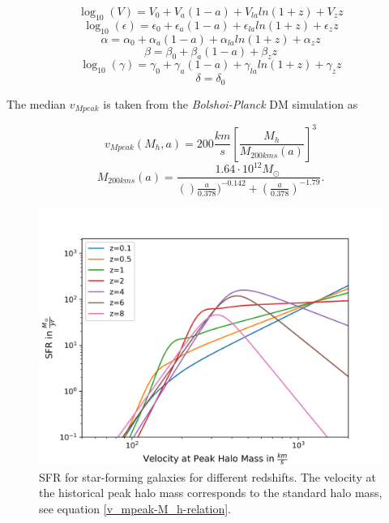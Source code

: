 \begin{equation}
    \log_{10}(V) = V_0 + V_a(1-a)+V_{la}ln(1+z)+V_z z
\end{equation}
\begin{equation}
    \log_{10}(\epsilon) = \epsilon_0 + \epsilon_a(1-a)+\epsilon_{la}ln(1+z)+\epsilon_z z
\end{equation}
\begin{equation}
    \alpha = \alpha_0 + \alpha_a(1-a)+\alpha_{la}ln(1+z)+\alpha_z z
\end{equation}
\begin{equation}
    \beta = \beta_0 + \beta_a(1-a)+\beta_z z
\end{equation}
\begin{equation}
    \log_{10}(\gamma) = \gamma_0 + \gamma_a(1-a)+\gamma_{la}ln(1+z)+\gamma_z z
\end{equation}
\begin{equation}
    \delta = \delta_0
\end{equation}

The median $v_{Mpeak}$ is taken from the \textit{Bolshoi-Planck} DM simulation as

\begin{equation}
    v_{Mpeak}(M_h, a) = 200 \frac{km}{s}\left[ \frac{M_h}{M_{200kms}(a)}\right]^3
    \label{v_mpeak-M_h-relation}
\end{equation}
\begin{equation}
    M_{200kms}(a) = \frac{1.64 \cdot 10^{12} M_\odot\ }{()\frac{a}{0.378})^{-0.142}+(\frac{a}{0.378})^{-1.79}} .
\end{equation}


\begin{figure}[h]
    \centering
    \includegraphics[width=1\linewidth]{Images/sfr_of_v.png}
    \caption{SFR for star-forming galaxies for different redshifts. The velocity at the historical peak halo mass corresponds to the standard halo mass, see equation \ref{v_mpeak-M_h-relation}.}
    \label{SFR_of_v}
\end{figure} 

